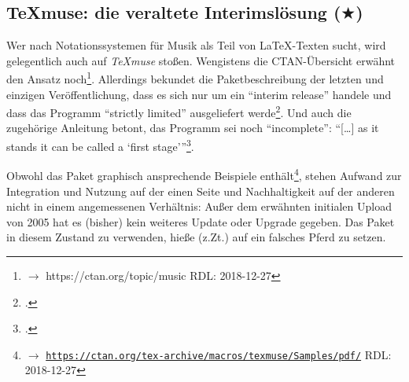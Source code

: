 %
%
%



\subsection{{\TeX}muse: die veraltete Interimslösung ($\bigstar$)}

Wer nach Notationssystemen für Musik als Teil von \LaTeX-Texten sucht, wird
gelegentlich auch auf \textit{{\TeX}muse} stoßen. Wengistens die CTAN-Übersicht
erwähnt den Ansatz noch\footnote{$\rightarrow$ https://ctan.org/topic/music RDL:
2018-12-27}. Allerdings bekundet die Paketbeschreibung der letzten und einzigen
Veröffentlichung, dass es sich nur um ein \enquote{in­terim re­lease} handele
und dass das Programm \enquote{strictly lim­ited} ausgeliefert
werde\footcite[vgl.][\nopage wp]{CtanTexmuse2005a}. Und auch die zugehörige
Anleitung betont, das Programm sei noch \enquote{incomplete}: \enquote{[\ldots]
as it stands it can be called a ‘first stage'}\footcite[vgl.][1]{Garcia2005a}.

Obwohl das Paket graphisch ansprechende Beispiele enthält\footnote{$\rightarrow$
\href{https://ctan.org/tex-archive/macros/texmuse/Samples/pdf/}
{\texttt{https://ctan.org/tex-archive/macros/texmuse/Samples/pdf/}} RDL:
2018-12-27}, stehen Aufwand zur Integration und Nutzung auf der einen Seite und
Nachhaltigkeit auf der anderen nicht in einem angemessenen Verhältnis: Außer dem
erwähnten initialen Upload von 2005 hat es (bisher) kein weiteres Update oder
Upgrade gegeben. Das Paket in diesem Zustand zu verwenden, hieße (z.Zt.) auf ein
falsches Pferd zu setzen.


%
